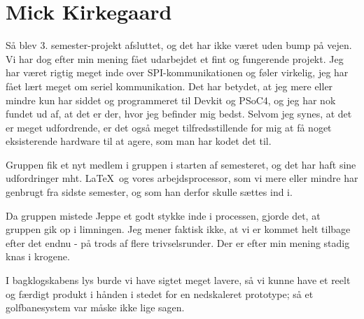 \section{Mick Kirkegaard}
Så blev 3. semester-projekt afsluttet, og det har ikke været uden bump på vejen. Vi har dog efter min mening fået udarbejdet et fint og fungerende projekt. Jeg har været rigtig meget inde over SPI-kommunikationen og føler virkelig, jeg har fået lært meget om seriel kommunikation. Det har betydet, at jeg mere eller mindre kun har siddet og programmeret til Devkit og PSoC4, og jeg har nok fundet ud af, at det er der, hvor jeg befinder mig bedst. Selvom jeg synes, at det er meget udfordrende, er det også meget tilfredsstillende for mig at få noget eksisterende hardware til at agere, som man har kodet det til.

Gruppen fik et nyt medlem i gruppen i starten af semesteret, og det har haft sine udfordringer mht. \LaTeX\ og vores arbejdsprocessor, som vi mere eller mindre har genbrugt fra sidste semester, og som han derfor skulle sættes ind i. 

Da gruppen mistede Jeppe et godt stykke inde i processen, gjorde det, at gruppen gik op i limningen. Jeg mener faktisk ikke, at vi er kommet helt tilbage efter det endnu - på trods af flere trivselsrunder. Der er efter min mening stadig knas i krogene.

I bagklogskabens lys burde vi have sigtet meget lavere, så vi kunne have et reelt og færdigt produkt i hånden i stedet for en nedskaleret prototype; så et golfbanesystem var måske ikke lige sagen.